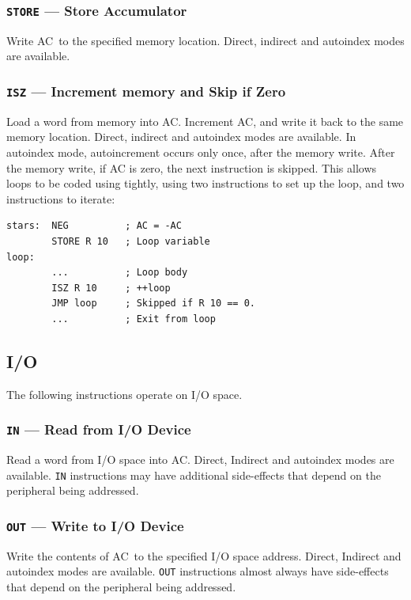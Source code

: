 \documentclass[11pt,a4paper,twocolumns]{article}
\newcommand\register[1]{\textsf{#1}}
\newcommand\A{\register{AC}}
\begin{document}
\subsubsection{{\tt STORE} — Store Accumulator}
\label{sec-store}

Write \A\ to the specified memory location. Direct, indirect and autoindex modes are available.

\subsubsection{{\tt ISZ} — Increment memory and Skip if Zero}
\label{sec-incm}

Load a word from memory into \A. Increment \A{}, and write it back to
the same memory location. Direct, indirect and autoindex modes are
available. In autoindex mode, autoincrement occurs only once, after
the memory write. After the memory write, if \A{} is zero, the next
instruction is skipped. This allows loops to be coded using tightly,
using two instructions to set up the loop, and two instructions to
iterate:

\begin{verbatim}
stars:  NEG          ; AC = -AC
        STORE R 10   ; Loop variable
loop:   
        ...          ; Loop body
        ISZ R 10     ; ++loop
        JMP loop     ; Skipped if R 10 == 0.
        ...          ; Exit from loop
\end{verbatim}

\subsection{I/O}

The following instructions operate on I/O space.

\subsubsection{{\tt IN} — Read from I/O Device}
\label{sec-in}

Read a word from I/O space into \A. Direct, Indirect and autoindex
modes are available. {\tt IN} instructions may have additional
side-effects that depend on the peripheral being addressed.

\subsubsection{{\tt OUT} — Write to I/O Device}
\label{sec-out}

Write the contents of \A\ to the specified I/O space address. Direct,
Indirect and autoindex modes are available. {\tt OUT} instructions
almost always have side-effects that depend on the peripheral being
addressed.
\end{document}
